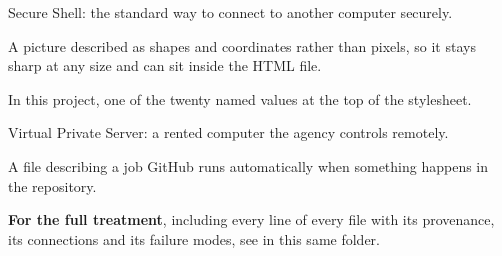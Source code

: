 \documentclass[11pt,a4paper]{article}
\begin{document}
\begin{description}[leftmargin=0pt,style=nextline]
\item[SSH] Secure Shell: the standard way to connect to another computer securely.
\item[SVG] A picture described as shapes and coordinates rather than pixels, so it
  stays sharp at any size and can sit inside the HTML file.
\item[Token] In this project, one of the twenty named values at the top of the
  stylesheet.
\item[VPS] Virtual Private Server: a rented computer the agency controls remotely.
\item[Workflow] A file describing a job GitHub runs automatically when something
  happens in the repository.
\end{description}

\vspace{1em}
\noindent
\textbf{For the full treatment}, including every line of every file with its
provenance, its connections and its failure modes, see
 in this same folder.
\end{document}
